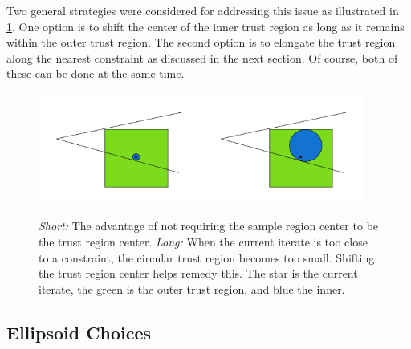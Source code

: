 Two general strategies were considered for addressing this issue as illustrated in \cref{options_basis}.
One option is to shift the center of the inner trust region as long as it remains within the outer trust region.
The second option is to elongate the trust region along the nearest constraint as discussed in the next section.
Of course, both of these can be done at the same time.


\begin{figure}[ht]
    \centering
    \includegraphics[width=200px]{images/small_circle.png}
    \includegraphics[width=200px]{images/shifted_center.png}
    \caption{
    	\emph{Short:} The advantage of not requiring the sample region center to be the trust region center.
    	\emph{Long:} When the current iterate is too close to a constraint, the circular trust region becomes too small.
    	Shifting the trust region center helps remedy this.
    	The star is the current iterate, the green is the outer trust region, and blue the inner.
    }
    \label{options_basis}
\end{figure}

\subsection{Ellipsoid Choices}

